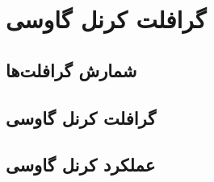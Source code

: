 \chapter{گرافلت کرنل گاوسی}
\section{شمارش گرافلت‌ها}
\section{گرافلت کرنل گاوسی}
\section{عملکرد کرنل گاوسی}